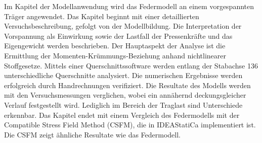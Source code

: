 Im Kapitel der Modellanwendung wird das Federmodell an einem vorgespannten Träger angewendet. Das Kapitel beginnt mit einer detaillierten Versuchsbeschreibung, gefolgt von der Modellbildung. Die Interpretation der Vorspannung als Einwirkung sowie der Lastfall der Pressenkräfte und das Eigengewicht werden beschrieben. Der Hauptaspekt der Analyse ist die Ermittlung der Momenten-Krümmungs-Beziehung anhand nichtlinearer Stoffgesetze. Mittels einer Querschnittssoftware werden entlang der Stabachse 136 unterschiedliche Querschnitte analysiert. Die numerischen Ergebnisse werden erfolgreich durch Handrechnungen verifiziert. Die Resultate des Modells werden mit den Versuchsmessungen verglichen, wobei ein annähernd deckungsgleicher Verlauf festgestellt wird. Lediglich im Bereich der Traglast sind Unterschiede erkennbar. Das Kapitel endet mit einem Vergleich des Federmodells mit der Compatible Stress Field Method (CSFM), die in IDEAStatiCa implementiert ist. Die CSFM zeigt ähnliche Resultate wie das Federmodell.
